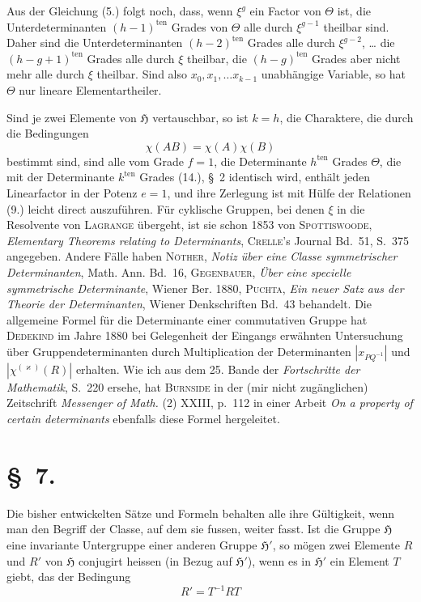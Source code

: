\documentclass[11pt]{article}
\newcommand{\grp}{\mathfrak{H}}
\begin{document}
Aus der Gleichung (5.) folgt noch, dass, wenn $\xi^g$ ein Factor von $\Theta$ ist, die Unterdeterminanten $(h-1)^{\text{ten}}$ Grades von $\Theta$ alle durch $\xi^{g-1}$ theilbar sind. Daher sind die Unterdeterminanten $(h-2)^{\text{ten}}$ Grades alle durch $\xi^{g-2}$, \ldots{} die $(h-g+1)^{\text{ten}}$ Grades alle durch $\xi$ theilbar, die $(h-g)^{\text{ten}}$ Grades aber nicht mehr alle durch $\xi$ theilbar. Sind also $x_0,x_1,\ldots x_{k-1}$ unabhängige Variable, so hat $\Theta$ nur lineare Elementartheiler.

Sind je zwei Elemente von $\grp$ vertauschbar, so ist $k=h$, die Charaktere, die durch die Bedingungen
\begin{equation*}\tag{9.}
\chi(AB)=\chi(A)\chi(B)
\end{equation*}
bestimmt sind, sind alle vom Grade $f=1$, die Determinante $h^{\text{ten}}$ Grades $\Theta$, die mit der Determinante $k^{\text{ten}}$ Grades (14.), \S~2 identisch wird, enthält jeden Linearfactor in der Potenz $e=1$, und ihre Zerlegung ist mit Hülfe der Relationen (9.) leicht direct auszuführen. Für cyklische Gruppen, bei denen $\xi$ in die Resolvente von \textsc{Lagrange} übergeht, ist sie schon 1853 von \textsc{Spottiswoode}, \emph{Elementary Theorems relating to Determinants}, \textsc{Crelle}'s Journal Bd.~51, S.~375 angegeben. Andere Fälle haben \textsc{Nöther}, \emph{Notiz über eine Classe symmetrischer Determinanten}, Math. Ann. Bd.~16, \textsc{Gegenbauer}, \emph{Über eine specielle symmetrische Determinante}, Wiener Ber. 1880, \textsc{Puchta}, \emph{Ein neuer Satz aus der Theorie der Determinanten}, Wiener Denkschriften Bd.~43 behandelt. Die allgemeine Formel für die Determinante einer commutativen Gruppe hat \textsc{Dedekind} im Jahre 1880 bei Gelegenheit der Eingangs erwähnten Untersuchung über Gruppendeterminanten durch Multiplication der Determinanten $\left|x_{PQ^{-1}}\right|$ und $\left|\chi^{(\varkappa)}(R)\right|$ erhalten. Wie ich aus dem 25. Bande der \emph{Fortschritte der Mathematik}, S.~220 ersehe, hat \textsc{Burnside} in der (mir nicht zugänglichen) Zeitschrift \emph{Messenger of Math.} (2) XXIII, p.~112 in einer Arbeit \emph{On a property of certain determinants} ebenfalls diese Formel hergeleitet.

\section*{\S~7.}

Die bisher entwickelten Sätze und Formeln behalten alle ihre Gültigkeit, wenn man den Begriff der Classe, auf dem sie fussen, weiter fasst. Ist die Gruppe $\grp$ eine invariante Untergruppe einer anderen Gruppe $\grp'$, so mögen zwei Elemente $R$ und $R'$ von $\grp$ conjugirt heissen (in Bezug auf $\grp'$), wenn es in $\grp'$ ein Element $T$ giebt, das der Bedingung
\begin{equation*}\tag{1.}
R'=T^{-1}RT
\end{equation*}
\end{document}
